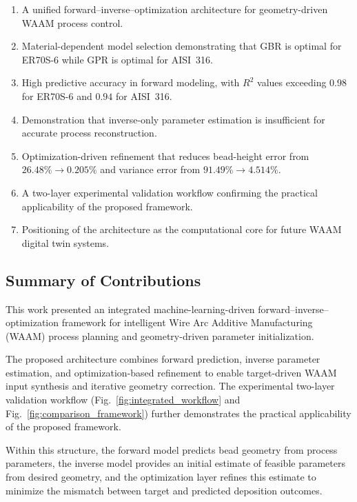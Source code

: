 \documentclass[11pt]{article}
\begin{document}
\begin{enumerate}
    \item A unified forward--inverse--optimization architecture for geometry-driven WAAM
          process control.
    \item Material-dependent model selection demonstrating that GBR is optimal for ER70S-6
          while GPR is optimal for AISI~316.
    \item High predictive accuracy in forward modeling, with $R^{2}$ values exceeding
          $0.98$ for ER70S-6 and $0.94$ for AISI~316.
    \item Demonstration that inverse-only parameter estimation is insufficient for
          accurate process reconstruction.
    \item Optimization-driven refinement that reduces bead-height error from
          $26.48\%\!\rightarrow\!0.205\%$ and variance error from
          $91.49\%\!\rightarrow\!4.514\%$.
    \item A two-layer experimental validation workflow confirming the practical
          applicability of the proposed framework.
    \item Positioning of the architecture as the computational core for future WAAM
          digital twin systems.
\end{enumerate}



\subsection{Summary of Contributions}

This work presented an integrated machine-learning-driven forward--inverse--optimization framework for intelligent Wire Arc Additive Manufacturing (WAAM) process planning and geometry-driven parameter initialization.

The proposed architecture combines forward prediction, inverse parameter estimation, and optimization-based refinement to enable target-driven WAAM input synthesis and iterative geometry correction. The experimental two-layer validation workflow (Fig.~\ref{fig:integrated_workflow} and Fig.~\ref{fig:comparison_framework}) further demonstrates the practical applicability of the proposed framework.

Within this structure, the forward model predicts bead geometry from process parameters, the inverse model provides an initial estimate of feasible parameters from desired geometry, and the optimization layer refines this estimate to minimize the mismatch between target and predicted deposition outcomes.
\end{document}
